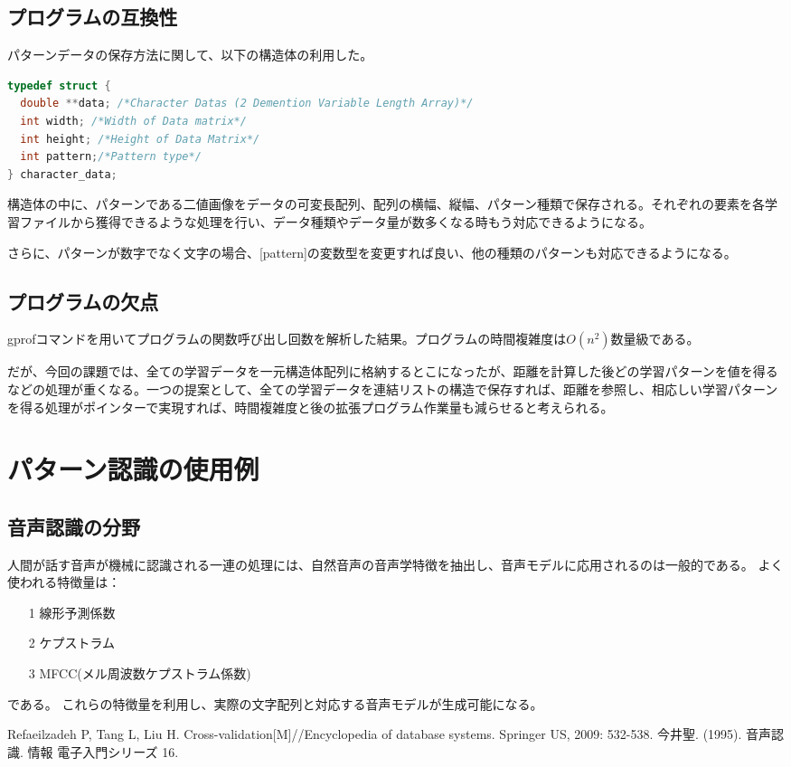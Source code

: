 \documentclass[ %
  uplatex,%
  papersize%
]{jsarticle}
\begin{document}
\subsection{プログラムの互換性}
パターンデータの保存方法に関して、以下の構造体の利用した。
\begin{lstlisting}[language=c]
typedef struct {
  double **data; /*Character Datas (2 Demention Variable Length Array)*/
  int width; /*Width of Data matrix*/
  int height; /*Height of Data Matrix*/
  int pattern;/*Pattern type*/
} character_data;
\end{lstlisting}

構造体の中に、パターンである二値画像をデータの可変長配列、配列の横幅、縦幅、パターン種類で保存される。それぞれの要素を各学習ファイルから獲得できるような処理を行い、データ種類やデータ量が数多くなる時もう対応できるようになる。

さらに、パターンが数字でなく文字の場合、[pattern]の変数型を変更すれば良い、他の種類のパターンも対応できるようになる。
\subsection{プログラムの欠点}
gprofコマンドを用いてプログラムの関数呼び出し回数を解析した結果。プログラムの時間複雑度は$O(n^{2})$数量級である。

だが、今回の課題では、全ての学習データを一元構造体配列に格納するとこになったが、距離を計算した後どの学習パターンを値を得るなどの処理が重くなる。一つの提案として、全ての学習データを連結リストの構造で保存すれば、距離を参照し、相応しい学習パターンを得る処理がポインターで実現すれば、時間複雑度と後の拡張プログラム作業量も減らせると考えられる。

\section{パターン認識の使用例}
\subsection{音声認識の分野}
人間が話す音声が機械に認識される一連の処理には、自然音声の音声学特徴を抽出し、音声モデルに応用されるのは一般的である。
よく使われる特徴量は：
\begin{itemize}
\item[1] 線形予測係数
\item[2] ケプストラム
\item[3] MFCC(メル周波数ケプストラム係数)
\end{itemize}
である。
これらの特徴量を利用し、実際の文字配列と対応する音声モデルが生成可能になる\cite{音声認識}。

\begin{thebibliography}{9}
     Refaeilzadeh P, Tang L, Liu H. Cross-validation[M]//Encyclopedia of database systems. Springer US, 2009: 532-538.
    今井聖. (1995). 音声認識. 情報 電子入門シリーズ 16.
\end{thebibliography}
\end{document}
